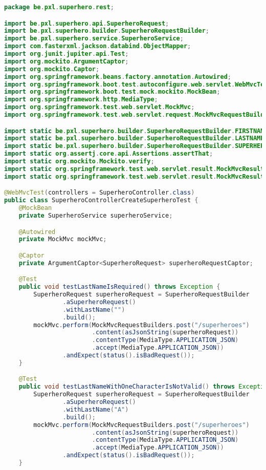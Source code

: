 \begin{lstlisting}[language=java, frame=single]
package be.pxl.superhero.rest;

import be.pxl.superhero.api.SuperheroRequest;
import be.pxl.superhero.builder.SuperheroRequestBuilder;
import be.pxl.superhero.service.SuperheroService;
import com.fasterxml.jackson.databind.ObjectMapper;
import org.junit.jupiter.api.Test;
import org.mockito.ArgumentCaptor;
import org.mockito.Captor;
import org.springframework.beans.factory.annotation.Autowired;
import org.springframework.boot.test.autoconfigure.web.servlet.WebMvcTest;
import org.springframework.boot.test.mock.mockito.MockBean;
import org.springframework.http.MediaType;
import org.springframework.test.web.servlet.MockMvc;
import org.springframework.test.web.servlet.request.MockMvcRequestBuilders;

import static be.pxl.superhero.builder.SuperheroRequestBuilder.FIRSTNAME;
import static be.pxl.superhero.builder.SuperheroRequestBuilder.LASTNAME;
import static be.pxl.superhero.builder.SuperheroRequestBuilder.SUPERHERO_NAME;
import static org.assertj.core.api.Assertions.assertThat;
import static org.mockito.Mockito.verify;
import static org.springframework.test.web.servlet.result.MockMvcResultHandlers.print;
import static org.springframework.test.web.servlet.result.MockMvcResultMatchers.status;

@WebMvcTest(controllers = SuperheroController.class)
public class SuperheroControllerCreateSuperheroTest {
	@MockBean
	private SuperheroService superheroService;

	@Autowired
	private MockMvc mockMvc;

	@Captor
	private ArgumentCaptor<SuperheroRequest> superheroRequestCaptor;

	@Test
	public void testLastNameIsRequired() throws Exception {
		SuperheroRequest superheroRequest = SuperheroRequestBuilder
				.aSuperheroRequest()
				.withLastName("")
				.build();
		mockMvc.perform(MockMvcRequestBuilders.post("/superheroes")
						.content(asJsonString(superheroRequest))
						.contentType(MediaType.APPLICATION_JSON)
						.accept(MediaType.APPLICATION_JSON))
				.andExpect(status().isBadRequest());
	}

	@Test
	public void testLastNameWithOneCharacterIsNotValid() throws Exception {
		SuperheroRequest superheroRequest = SuperheroRequestBuilder
				.aSuperheroRequest()
				.withLastName("A")
				.build();
		mockMvc.perform(MockMvcRequestBuilders.post("/superheroes")
						.content(asJsonString(superheroRequest))
						.contentType(MediaType.APPLICATION_JSON)
						.accept(MediaType.APPLICATION_JSON))
				.andExpect(status().isBadRequest());
	}



\end{lstlisting}
